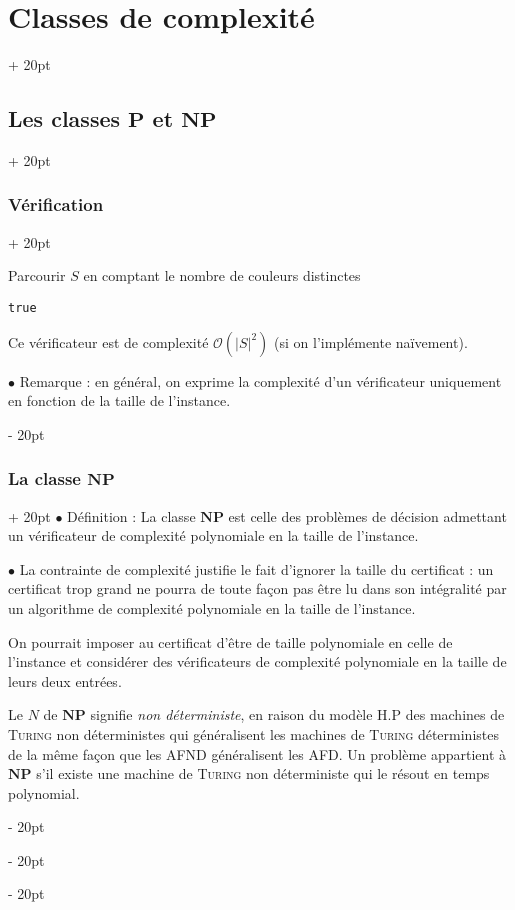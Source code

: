 \documentclass[a4paper, 12pt, twoside]{article}
\newenvironment{indalgo}[2][H]{
    \begin{algoBox}
        \begin{algorithm}[#1]
            \caption{#2}
}
{
        \end{algorithm}
    \end{algoBox}
}
\newcommand{\lr}[1]{\left( #1 \right)}
\newcommand{\set}[1]{\left\{ #1 \right\}}
\newcommand{\abs}[1]{\left\lvert #1 \right\rvert}
\newcommand{\ind}[1][20pt]{\advance\leftskip + #1}
\newcommand{\deind}[1][20pt]{\advance\leftskip - #1}
\newenvironment{indt}[2][20pt]{#2 \par \ind[#1]}{\par \deind} %
\begin{document}
\begin{indt}{\section{Classes de complexité}}
\begin{indt}{\subsection{Les classes $\mathbf P$ et $\mathbf{NP}$}}
\begin{indt}{\subsubsection{Vérification}}
\begin{indalgo}{Vérificateur du problème de coloration}
                    \BlankLine

                    Parcourir $S$ en comptant le nombre de couleurs distinctes\;


                    \For{tout $\set{s, s'} \in A$}{
                        \If{$c(s) = c(s')$}{
                            \Return \texttt{false}\;
                        }
                    }

                    \Return \texttt{true}\;
                \end{indalgo}

                Ce vérificateur est de complexité $\mathcal O\!\lr{\abs S ^2}$ (si on l'implémente naïvement).

                \vspace{12pt}
                
                $\bullet$ Remarque : en général, on exprime la complexité d'un vérificateur uniquement  en fonction de la taille de l'instance.
            \end{indt}

            \vspace{12pt}
            
            \begin{indt}{\subsubsection{La classe $\mathbf{NP}$}}
                $\bullet$ Définition : La classe $\mathbf{NP}$ est celle des problèmes de décision admettant un vérificateur de complexité polynomiale en la taille de l'instance.

                \vspace{12pt}
                
                $\bullet$ La contrainte de complexité justifie le fait d'ignorer la taille du certificat : un certificat trop grand ne pourra de toute façon pas être lu dans son intégralité par un algorithme de complexité polynomiale en la taille de l'instance.

                On pourrait imposer au certificat d'être de taille polynomiale en celle de l'instance et considérer des vérificateurs de complexité polynomiale en la taille de leurs deux entrées.

                Le $N$ de $\mathbf{NP}$ signifie \emph{non déterministe}, en raison du modèle H.P des machines de \textsc{Turing} non déterministes qui généralisent les machines de \textsc{Turing} déterministes de la même façon que les AFND généralisent les AFD.
                Un problème appartient à $\mathbf{NP}$ s'il existe une machine de \textsc{Turing} non déterministe qui le résout en temps polynomial.


\end{indt}
\end{indt}
\end{indt}
\end{document}
